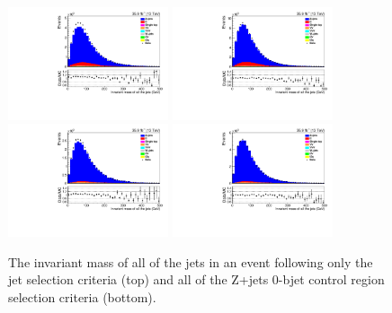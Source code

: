 \begin{figure}[ht]
\centering
\includegraphics[width=0.42\textwidth]{figs/background-estimation/plots/unblinded/DY_control_old_prompt_ee_ttbarInc/totalJetMass_SingleTop_jetSel_ee.pdf}
\includegraphics[width=0.42\textwidth]{figs/background-estimation/plots/unblinded/DY_control_old_prompt_mumu_ttbarInc/totalJetMass_SingleTop_jetSel_mumu.pdf}
\\
\includegraphics[width=0.42\textwidth]{figs/background-estimation/plots/unblinded/DY_control_old_prompt_ee_ttbarInc/totalJetMass_SingleTop_wMass_ee.pdf}
\includegraphics[width=0.42\textwidth]{figs/background-estimation/plots/unblinded/DY_control_old_prompt_mumu_ttbarInc/totalJetMass_SingleTop_wMass_mumu.pdf}
\caption{
The invariant mass of all of the jets in an event following only the jet selection criteria (top) and all of the Z+jets 0-bjet control region selection criteria (bottom).
}
\label{fig:CR_LO_totalJetMass}
\end{figure}

